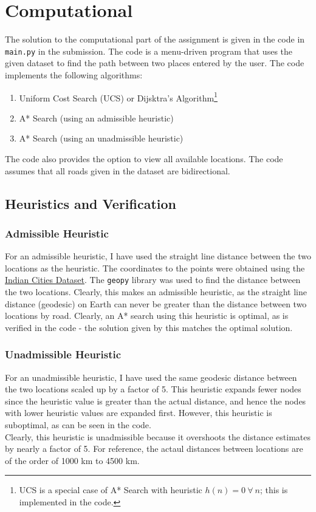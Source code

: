 \documentclass[12pt]{article}
\begin{document}
    \section*{Computational}
    The solution to the computational part of the assignment is given in the code in \texttt{main.py} in the submission.
    The code is a menu-driven program that uses the given dataset to find the path between two places entered by the user.
    The code implements the following algorithms:
    \begin{enumerate}
        \item Uniform Cost Search (UCS) or Dijsktra's Algorithm\footnote{UCS is a special case of A* Search with heuristic
        $h(n) = 0 \ \forall \ n$; this is implemented in the code.}
        \item A* Search (using an admissible heuristic)
        \item A* Search (using an unadmissible heuristic)
    \end{enumerate}
    The code also provides the option to view all available locations. The code assumes that all roads given
    in the dataset are bidirectional.

    \subsection*{Heuristics and Verification}
    \subsubsection*{Admissible Heuristic}
    For an admissible heuristic, I have used the straight line distance between the two locations as the heuristic.
    The coordinates to the points were obtained using the
    \href{https://simplemaps.com/data/in-cities}{\underline{Indian Cities Dataset}}.
    The \texttt{geopy} library was used to find the distance between the two locations. Clearly,
    this makes an admissible heuristic, as the straight line distance (geodesic) on Earth
    can never be greater than the distance between two locations by road.
    Clearly, an A* search using this heuristic is optimal, as is verified in the code - the solution given by
    this matches the optimal solution.

    \subsubsection*{Unadmissible Heuristic}
    For an unadmissible heuristic, I have used the same geodesic distance between the two locations scaled up
    by a factor of 5. This heuristic expands fewer nodes since the heuristic value is greater than the actual
    distance, and hence the nodes with lower heuristic values are expanded first. However, this heuristic is
    suboptimal, as can be seen in the code. \\
    Clearly, this heuristic is unadmissible because it overshoots the distance estimates by nearly a factor
    of 5. For reference, the actaul distances between locations are of the order of 1000 km to 4500 km.
\end{document}
